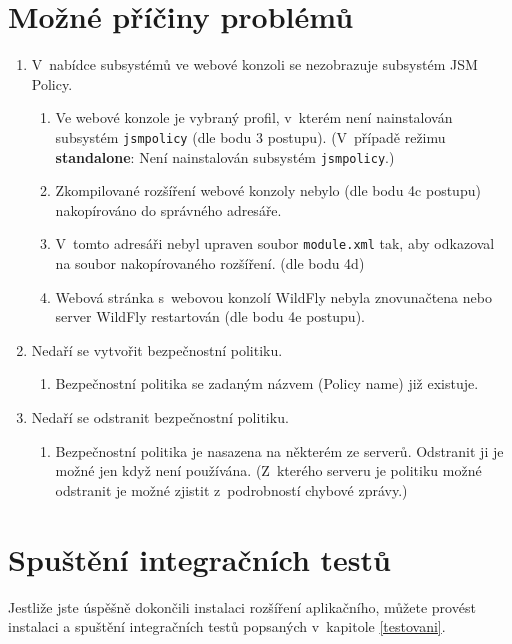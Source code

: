 \section{Možné příčiny problémů}
\begin{enumerate}
    \item V~nabídce subsystémů ve webové konzoli se nezobrazuje subsystém JSM Policy.
    \begin{enumerate}
        \item Ve webové konzole je vybraný profil, v~kterém není nainstalován subsystém {\tt jsmpolicy} (dle bodu 3 postupu). (V~případě režimu {\bf standalone}: Není nainstalován subsystém {\tt jsmpolicy}.)
        \item Zkompilované rozšíření webové konzoly nebylo (dle bodu 4c postupu) nakopírováno do správného adresáře.
        \item V~tomto adresáři nebyl upraven soubor {\tt module.xml} tak, aby odkazoval na soubor nakopírovaného rozšíření. (dle bodu 4d)
        \item Webová stránka s~webovou konzolí WildFly nebyla znovunačtena nebo server WildFly restartován (dle bodu 4e postupu).
    \end{enumerate}
    \item Nedaří se vytvořit bezpečnostní politiku.
    \begin{enumerate}
        \item Bezpečnostní politika se zadaným názvem (Policy name) již existuje.
    \end{enumerate}
    \item Nedaří se odstranit bezpečnostní politiku.
    \begin{enumerate}
        \item Bezpečnostní politika je nasazena na některém ze serverů. Odstranit ji je možné jen když není používána. (Z~kterého serveru je politiku možné odstranit je možné zjistit z~podrobností chybové zprávy.)
    \end{enumerate}
\end{enumerate}


\section{Spuštění integračních testů}

Jestliže jste úspěšně dokončili instalaci rozšíření aplikačního, můžete provést instalaci a spuštění integračních testů popsaných v~kapitole \ref{testovani}.

